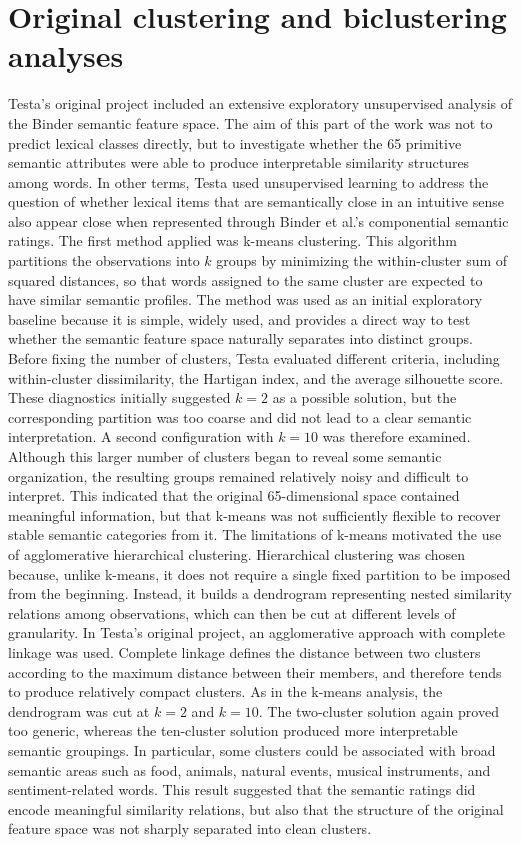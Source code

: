 \documentclass{ipgpmaster}
\begin{document}
\newpage


\appendix
\section{Original clustering and biclustering analyses}
Testa's original project included an extensive exploratory unsupervised analysis of the Binder semantic feature space. The aim of this part of the work was not to predict lexical classes directly, but to investigate whether the 65 primitive semantic attributes were able to produce interpretable similarity structures among words. In other terms, Testa used unsupervised learning to address the question of whether lexical items that are semantically close in an intuitive sense also appear close when represented through Binder et al.'s componential semantic ratings.
The first method applied was k-means clustering. This algorithm partitions the observations into \(k\) groups by minimizing the within-cluster sum of squared distances, so that words assigned to the same cluster are expected to have similar semantic profiles. The method was used as an initial exploratory baseline because it is simple, widely used, and provides a direct way to test whether the semantic feature space naturally separates into distinct groups. Before fixing the number of clusters, Testa evaluated different criteria, including within-cluster dissimilarity, the Hartigan index, and the average silhouette score. These diagnostics initially suggested \(k = 2\) as a possible solution, but the corresponding partition was too coarse and did not lead to a clear semantic interpretation. A second configuration with \(k = 10\) was therefore examined. Although this larger number of clusters began to reveal some semantic organization, the resulting groups remained relatively noisy and difficult to interpret. This indicated that the original 65-dimensional space contained meaningful information, but that k-means was not sufficiently flexible to recover stable semantic categories from it.
The limitations of k-means motivated the use of agglomerative hierarchical clustering. Hierarchical clustering was chosen because, unlike k-means, it does not require a single fixed partition to be imposed from the beginning. Instead, it builds a dendrogram representing nested similarity relations among observations, which can then be cut at different levels of granularity. In Testa's original project, an agglomerative approach with complete linkage was used. Complete linkage defines the distance between two clusters according to the maximum distance between their members, and therefore tends to produce relatively compact clusters. As in the k-means analysis, the dendrogram was cut at \(k = 2\) and \(k = 10\). The two-cluster solution again proved too generic, whereas the ten-cluster solution produced more interpretable semantic groupings. In particular, some clusters could be associated with broad semantic areas such as food, animals, natural events, musical instruments, and sentiment-related words. This result suggested that the semantic ratings did encode meaningful similarity relations, but also that the structure of the original feature space was not sharply separated into clean clusters.
\end{document}
